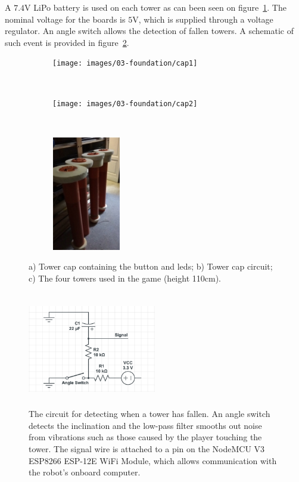 A $7.4$V LiPo battery is used on each tower as can been seen on figure~\ref{fig:tower_caps}. The nominal voltage for the boards is $5$V, which is supplied through a voltage regulator. An angle switch allows the detection of fallen towers. A schematic of such event is provided in figure~\ref{fig:tilt_circuit}.

\begin{figure}[H]
  \centering
  \begin{subfigure}[t]{0.33\textwidth}
  	\centering
    \texttt{[image: images/03-foundation/cap1]}
	\caption{}
  \end{subfigure}
  ~ 
  \begin{subfigure}[t]{0.33\textwidth}
  	\centering
    \texttt{[image: images/03-foundation/cap2]}
	\caption{}
  \end{subfigure}
  ~
   \begin{subfigure}[b]{0.33\textwidth}
	  \centering
      \includegraphics[width=3cm,  height=5cm]{images/04-activity/tubes.jpg}
      \caption{}
    \end{subfigure}
  \caption{a) Tower cap containing the button and \gls{led}s; b) Tower cap circuit; c) The four towers used in the game (height 110cm).}
  \label{fig:tower_caps}
\end{figure}


\begin{figure}[H]
	\centering
		\includegraphics[width=0.5\textwidth, height=5cm]{images/03-foundation/tilt_sensor_circuit}
	\caption{The circuit for detecting when a tower has fallen. An angle switch detects the inclination and the low-pass filter smooths out noise from vibrations such as those caused by the player touching the tower. The signal wire is attached to a pin on the NodeMCU V3 ESP8266 ESP-12E WiFi Module, which allows communication with the robot's onboard computer.}
    \label{fig:tilt_circuit} 
\end{figure}

